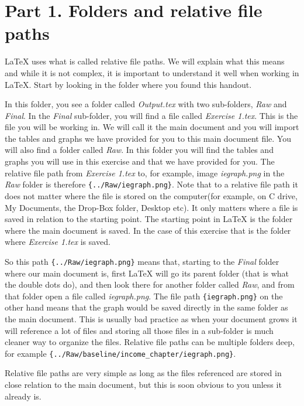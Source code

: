 \documentclass[12pts]{report}
\begin{document}
\section*{Part 1. Folders and relative file paths}
{\LaTeX} uses what is called relative file paths. We will explain what this means and while it is not complex, it is important to understand it well when working in {\LaTeX}. Start by looking in the folder where you found this handout. 

In this folder, you see a folder called \emph{Output.tex} with two sub-folders, \emph{Raw} and \emph{Final}. In the \emph{Final} sub-folder, you will find a file called \emph{Exercise 1.tex}. This is the file you will be working in. We will call it the main document and you will import the tables and graphs we have provided for you to this main document file. You will also find a folder called \emph{Raw}. In this folder you will find the tables and graphs you will use in this exercise and that we have provided for you. The relative file path from \emph{Exercise 1.tex} to, for example, image \emph{iegraph.png} in the \emph{Raw} folder is therefore \verb|{../Raw/iegraph.png}|. Note that to a relative file path it does not matter where the file is stored on the computer(for example, on C drive, My Documents, the Drop-Box folder, Desktop etc). It only matters where a file is saved in relation to the starting point. The starting point in {\LaTeX} is the folder where the main document is saved. In the case of this exercise that is the folder where \emph{Exercise 1.tex} is saved.

So this path \verb|{../Raw/iegraph.png}| means that, starting to the \emph{Final} folder where our main document is, first {\LaTeX} will go its parent folder (that is what the double dots do), and then look there for another folder called \emph{Raw}, and from that folder open a file called \emph{iegraph.png}. The file path \verb|{iegraph.png}| on the other hand means that the graph would be saved directly in the same folder as the main document. This is usually bad practice as when your document grows it will reference a lot of files and storing all those files in a sub-folder is much cleaner way to organize the files. Relative file paths can be multiple folders deep, for example \verb|{../Raw/baseline/income_chapter/iegraph.png}|. 

Relative file paths are very simple as long as the files referenced are stored in close relation to the main document, but this is soon obvious to you unless it already is.
\end{document}
